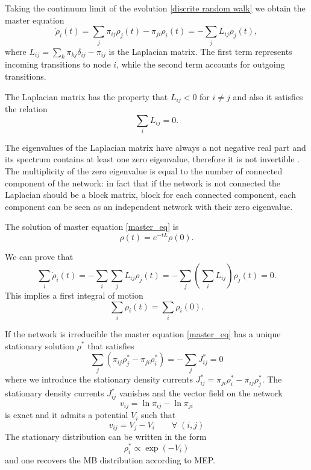 Taking the continuum limit of the evolution \eqref{discrite random walk} we obtain the master equation \cite{Classic_random_walk}
\begin{equation}\label{master_eq}
    \dot \rho_i(t) = \sum_j \pi_{ij}\rho_j(t) - \pi_{ji}\rho_i(t) = - \sum_j L_{ij} \rho_j(t),
\end{equation}
where $L_{ij} = \sum_k \pi_{kj}\delta_{ij} -\pi_{ij} $ is the Laplacian matrix.
The first term represents incoming transitions to node $i$, while the second term accounts for outgoing transitions.

The Laplacian matrix has the property that $L_{ij} < 0 $ for $i \neq j$ and also it satisfies the relation
\begin{equation}
    \sum_i L_{ij} = 0 .
\end{equation} 

The eigenvalues of the Laplacian matrix have always a not negative real part and its spectrum contains at least one zero eigenvalue, therefore it is not invertible \cite{Boccaletti}. The multiplicity of the zero eigenvalue is equal to the number of connected component of the network: in fact that if the network is not connected the Laplacian should be a block matrix,  block for each connected component, each component can be seen as an independent network with their zero eigenvalue.

The solution of master equation \eqref{master_eq} is
\begin{equation}\label{random_walk_solution}
    \rho(t) = e^{-tL}\rho(0).
\end{equation}

We can prove that
\begin{equation}
    \sum_i \dot\rho_i(t) = - \sum_i \sum_j L_{ij} \rho_j(t) = - \sum_j \left(\sum_i L_{ij}\right) \rho_j(t) = 0 .
\end{equation}
This implies a first integral of motion 
\begin{equation}
    \sum_i \rho_i(t) = \sum_i \rho_i(0) .
\end{equation}

If the network is irreducible the master equation \eqref{master_eq} has a unique stationary solution $\rho^*$ that satisfies
\begin{equation}
    \sum_j (\pi_{ij}\rho_j^\ast-\pi_{ji}\rho_i^\ast)=-\sum_j J^*_{ij}=0
\end{equation}
where we introduce the stationary density currents $J^*_{ij} = \pi_{ji}\rho_i^\ast-\pi_{ij}\rho_j^\ast $.
The stationary density currents $J_{ij}^\ast$ vanishes and the vector field on the network
$$
v_{ij}=\ln \pi_{ij}-\ln \pi_{ji}
$$
is exact and it admits a potential $V_i$ such that
$$
v_{ij}=V_j-V_i\qquad \forall \; (i,j)
$$
The stationary distribution can be written in the form
\begin{equation}
    \label{MB}
    \rho_i^\ast \propto \exp(-V_i)
\end{equation}
and one recovers the MB distribution according to MEP.

